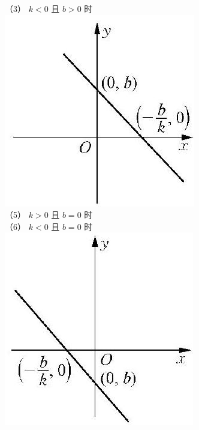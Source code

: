 \documentclass[10pt]{article}
\begin{document}
（3） $k<0$ 且 $b>0$ 时\\
\includegraphics[max width=\textwidth, center]{2024_10_30_1bf34f7aeb61f11d11d3g-010(5)}\\
（5） $k>0$ 且 $b=0$ 时\\
（6） $k<0$ 且 $b=0$ 时\\
\includegraphics[max width=\textwidth, center]{2024_10_30_1bf34f7aeb61f11d11d3g-010(3)}\\
\end{document}
